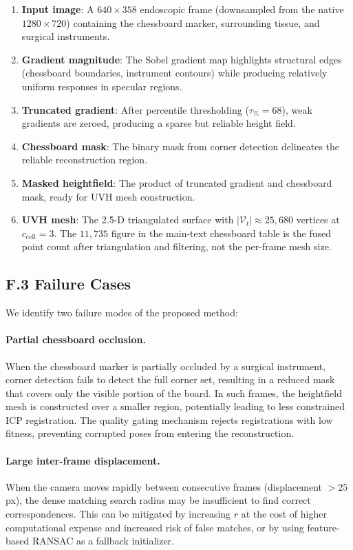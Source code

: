 \documentclass[review]{elsarticle}
\begin{document}
\begin{enumerate}[noitemsep]
    \item \textbf{Input image}: A $640 \times 358$ endoscopic frame (downsampled from the native $1280 \times 720$) containing the chessboard marker, surrounding tissue, and surgical instruments.
    \item \textbf{Gradient magnitude}: The Sobel gradient map highlights structural edges (chessboard boundaries, instrument contours) while producing relatively uniform responses in specular regions.
    \item \textbf{Truncated gradient}: After percentile thresholding ($\tau_{\%}=68$), weak gradients are zeroed, producing a sparse but reliable height field.
    \item \textbf{Chessboard mask}: The binary mask from corner detection delineates the reliable reconstruction region.
    \item \textbf{Masked heightfield}: The product of truncated gradient and chessboard mask, ready for UVH mesh construction.
    \item \textbf{UVH mesh}: The 2.5-D triangulated surface with $|\mathcal{V}_t| \approx 25{,}680$ vertices at $c_{\mathrm{cell}}{=}3$. The $11{,}735$ figure in the main-text chessboard table is the fused point count after triangulation and filtering, not the per-frame mesh size.
\end{enumerate}

\subsection*{F.3 Failure Cases}

We identify two failure modes of the proposed method:

\paragraph{Partial chessboard occlusion.}
When the chessboard marker is partially occluded by a surgical instrument, corner detection fails to detect the full corner set, resulting in a reduced mask that covers only the visible portion of the board.
In such frames, the heightfield mesh is constructed over a smaller region, potentially leading to less constrained ICP registration.
The quality gating mechanism rejects registrations with low fitness, preventing corrupted poses from entering the reconstruction.

\paragraph{Large inter-frame displacement.}
When the camera moves rapidly between consecutive frames (displacement $> 25$\,px), the dense matching search radius may be insufficient to find correct correspondences.
This can be mitigated by increasing $r$ at the cost of higher computational expense and increased risk of false matches, or by using feature-based RANSAC as a fallback initializer.
\end{document}
